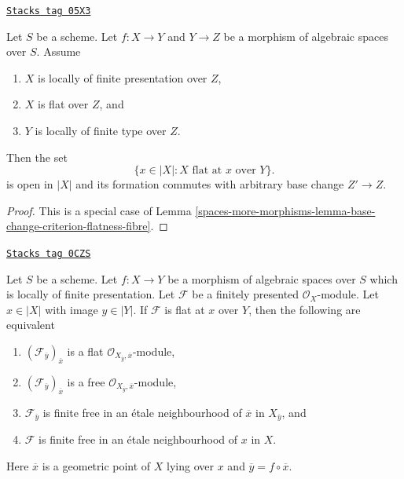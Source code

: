 \begin{lemma}
\label{spaces-more-morphisms-lemma-base-change-flatness-fibres}
\href{https://stacks.math.columbia.edu/tag/05X3}{\texttt{Stacks tag 05X3}}

Let $S$ be a scheme.
Let $f : X \to Y$ and $Y \to Z$ be a morphism of algebraic spaces over $S$.
Assume
\begin{enumerate}
\item $X$ is locally of finite presentation over $Z$,
\item $X$ is flat over $Z$, and
\item $Y$ is locally of finite type over $Z$.
\end{enumerate}
Then the set
$$
\{x \in |X| : X\text{ flat at }x \text{ over }Y\}.
$$
is open in $|X|$ and its formation commutes with arbitrary base change
$Z' \to Z$.
\end{lemma}

\begin{proof}
This is a special case of
Lemma \ref{spaces-more-morphisms-lemma-base-change-criterion-flatness-fibre}.
\end{proof}

\begin{lemma}
\label{spaces-more-morphisms-lemma-flat-and-free-at-point-fibre}
\href{https://stacks.math.columbia.edu/tag/0CZS}{\texttt{Stacks tag 0CZS}}

Let $S$ be a scheme. Let $f : X \to Y$ be a morphism of algebraic spaces
over $S$ which is locally of finite presentation.
Let $\mathcal{F}$ be a finitely presented $\mathcal{O}_X$-module.
Let $x \in |X|$ with image $y \in |Y|$. If $\mathcal{F}$ is flat at $x$
over $Y$, then the following are equivalent
\begin{enumerate}
\item $(\mathcal{F}_{\overline{y}})_{\overline{x}}$ is a flat
$\mathcal{O}_{X_{\overline{y}}, \overline{x}}$-module,
\item $(\mathcal{F}_{\overline{y}})_{\overline{x}}$ is a free
$\mathcal{O}_{X_{\overline{y}}, \overline{x}}$-module,
\item $\mathcal{F}_{\overline{y}}$ is finite free in an
\'etale neighbourhood of $\overline{x}$ in $X_{\overline{y}}$, and
\item $\mathcal{F}$ is finite free in an \'etale neighbourhood of $x$ in $X$.
\end{enumerate}
Here $\overline{x}$ is a geometric point of $X$ lying over $x$
and $\overline{y} = f \circ \overline{x}$.
\end{lemma}

